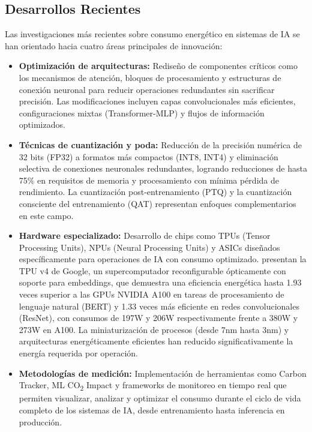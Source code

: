 \subsection{Desarrollos Recientes}

Las investigaciones más recientes sobre consumo energético en sistemas de IA se han orientado hacia cuatro áreas principales de innovación:

\begin{itemize}
    \item \textbf{Optimización de arquitecturas:} Rediseño de componentes críticos como los mecanismos de atención, bloques de procesamiento y estructuras de conexión neuronal para reducir operaciones redundantes sin sacrificar precisión. Las modificaciones incluyen capas convolucionales más eficientes, configuraciones mixtas (Transformer-MLP) y flujos de información optimizados.
    
    \item \textbf{Técnicas de cuantización y poda:} Reducción de la precisión numérica de 32 bits (FP32) a formatos más compactos (INT8, INT4) y eliminación selectiva de conexiones neuronales redundantes, logrando reducciones de hasta 75\% en requisitos de memoria y procesamiento con mínima pérdida de rendimiento. La cuantización post-entrenamiento (PTQ) y la cuantización consciente del entrenamiento (QAT) representan enfoques complementarios en este campo.
    
    \item \textbf{Hardware especializado:} Desarrollo de chips como TPUs (Tensor Processing Units), NPUs (Neural Processing Units) y ASICs diseñados específicamente para operaciones de IA con consumo optimizado. \textcite{jouppi2023tpu} presentan la TPU v4 de Google, un supercomputador reconfigurable ópticamente con soporte para embeddings, que demuestra una eficiencia energética hasta 1.93 veces superior a las GPUs NVIDIA A100 en tareas de procesamiento de lenguaje natural (BERT) y 1.33 veces más eficiente en redes convolucionales (ResNet), con consumos de 197W y 206W respectivamente frente a 380W y 273W en A100. La miniaturización de procesos (desde 7nm hasta 3nm) y arquitecturas energéticamente eficientes han reducido significativamente la energía requerida por operación.
    
    \item \textbf{Metodologías de medición:} Implementación de herramientas como Carbon Tracker, ML CO\textsubscript{2} Impact y frameworks de monitoreo en tiempo real que permiten visualizar, analizar y optimizar el consumo durante el ciclo de vida completo de los sistemas de IA, desde entrenamiento hasta inferencia en producción.
\end{itemize}

